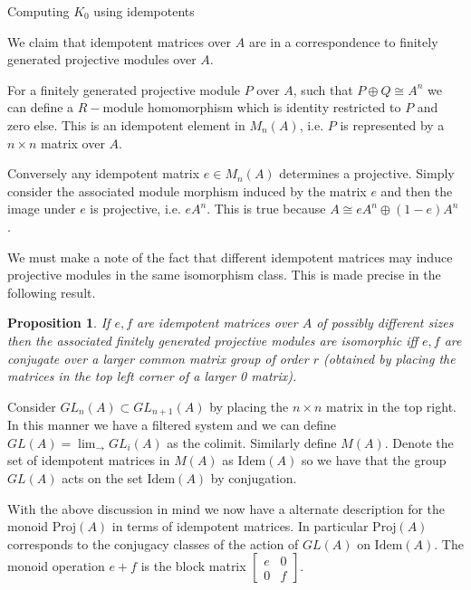 \documentclass{beamer}
\newcounter{dummy} \numberwithin{dummy}{section}
\newtheorem{proposition}[dummy]{Proposition}
\begin{document}
\begin{frame}[allowframebreaks]{Computing $K_0$ using idempotents}
	
	We claim that idempotent matrices over $A$ are in a correspondence to finitely generated projective modules over $A$.
	
	For a finitely generated projective module $P$ over $A$, such that $P \oplus Q \cong A^n$ we can define a $R-$module homomorphism which is identity restricted to $P$ and zero else. This is an idempotent element in $M_n(A)$, i.e. $P$ is represented by a $n\times n $ matrix over $A$.
	
	Conversely any idempotent matrix $e \in M_n(A)$ determines a projective. Simply consider the associated module morphism induced by the matrix $e$ and then the image under $e$ is projective, i.e. $eA^n$. This is true because $A \cong eA^n \oplus (1-e)A^n$ .
	
	We must make a note of the fact that different idempotent matrices may induce projective modules in the same isomorphism class. This is made precise in the following result.
	
	\begin{proposition}
		If $e, f $ are idempotent matrices over $A$ of possibly different sizes then the associated finitely generated projective modules are isomorphic iff $e,f $ are conjugate over a larger common matrix group of order $r$ (obtained by placing the matrices in the top left corner of a larger 0 matrix).
	\end{proposition}
	
	Consider $GL_n(A) \subset GL_{n+1}(A)$ by placing the $n\times n $ matrix in the top right. In this manner we have a filtered system and we can define $GL(A)= \lim_{\to} GL_i(A)$ as the colimit. Similarly define $M(A)$. Denote the set of idempotent matrices in $M(A)$ as $\mathrm{Idem}(A)$ so we have that the group $GL(A)$ acts on the set $\mathrm{Idem}(A)$ by conjugation.
	
	With the above discussion in mind we now have a alternate description for the monoid $\mathrm{Proj}(A)$ in terms of idempotent matrices. In particular $\mathrm{Proj}(A)$ corresponds to the conjugacy classes of the action of $GL(A)$ on $\mathrm{Idem}(A)$. The monoid operation $e +f$ is the block matrix $\begin{bmatrix}
		e & 0 \\ 0 & f
	\end{bmatrix}. $
	

\end{frame}
\end{document}
